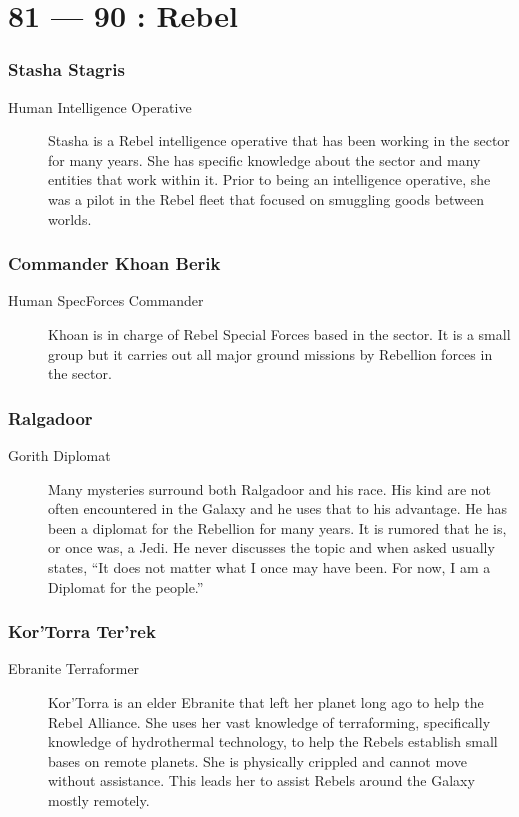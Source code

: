 \documentclass{article}
\begin{document}
\part*{81 --- 90 : Rebel}
\setcounter{section}{80}
\section{Stasha Stagris}
\begin{description}
	\item [Human \female Intelligence Operative] Stasha is a Rebel intelligence operative that has been working in the sector for many years. She has specific knowledge about the sector and many entities that work within it. Prior to being an intelligence operative, she was a pilot in the Rebel fleet that focused on smuggling goods between worlds.
\end{description}
\section{Commander Khoan Berik}
\begin{description}
	\item [Human \male SpecForces Commander] Khoan is in charge of Rebel Special Forces based in the sector. It is a small group but it carries out all major ground missions by Rebellion forces in the sector.
\end{description}
\section{Ralgadoor}
\begin{description}
	\item [Gorith \male Diplomat] Many mysteries surround both Ralgadoor and his race. His kind are not often encountered in the Galaxy and he uses that to his advantage. He has been a diplomat for the Rebellion for many years. It is rumored that he is, or once was, a Jedi. He never discusses the topic and when asked usually states, “It does not matter what I once may have been. For now, I am a Diplomat for the people.”
\end{description}
\section{Kor’Torra Ter’rek}
\begin{description}
	\item [Ebranite \female Terraformer] Kor’Torra is an elder Ebranite that left her planet long ago to help the Rebel Alliance. She uses her vast knowledge of terraforming, specifically knowledge of hydrothermal technology, to help the Rebels establish small bases on remote planets. She is physically crippled and cannot move without assistance. This leads her to assist Rebels around the Galaxy mostly remotely.
\end{description}
\end{document}
